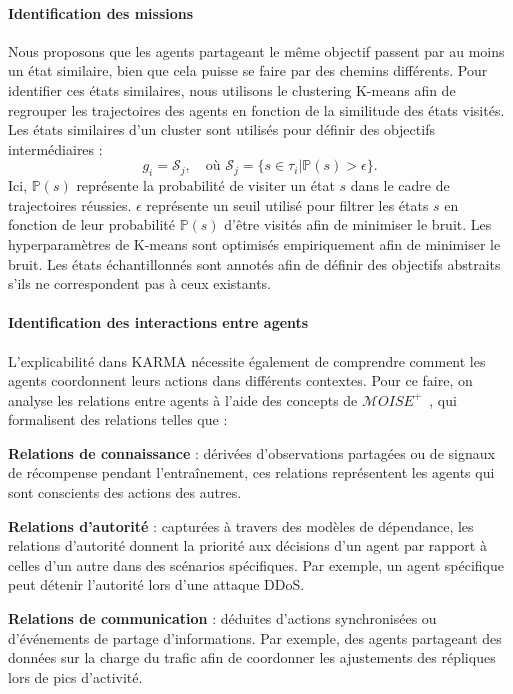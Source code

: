 \paragraph*{\textbf{Identification des missions}}

Nous proposons que les agents partageant le même objectif passent par au moins un état similaire, bien que cela puisse se faire par des chemins différents. Pour identifier ces états similaires, nous utilisons le clustering K-means afin de regrouper les trajectoires des agents en fonction de la similitude des états visités. Les états similaires d'un cluster sont utilisés pour définir des objectifs intermédiaires :
\[
g_i = \mathcal{S}_j, \quad \text{où } \mathcal{S}_j = \{s \in \tau_i | \mathbb{P}(s) > \epsilon\}.
\]
Ici, $\mathbb{P}(s)$ représente la probabilité de visiter un état $s$ dans le cadre de trajectoires réussies. $\epsilon$ représente un seuil utilisé pour filtrer les états $s$ en fonction de leur probabilité $\mathbb{P}(s)$ d'être visités afin de minimiser le bruit. Les hyperparamètres de K-means sont optimisés empiriquement afin de minimiser le bruit. Les états échantillonnés sont annotés afin de définir des objectifs abstraits s'ils ne correspondent pas à ceux existants.


\paragraph*{\textbf{Identification des interactions entre agents}}

L'explicabilité dans KARMA nécessite également de comprendre comment les agents coordonnent leurs actions dans différents contextes. Pour ce faire, on analyse les relations entre agents à l'aide des concepts de $\mathcal{M}OISE^+$~\cite{hubner2002moise}, qui formalisent des relations telles que :
\begin{enumerate*}[label=\textbf{\arabic*)}, itemjoin={;\quad }]
    \item \textbf{Relations de connaissance} : dérivées d'observations partagées ou de signaux de récompense pendant l'entraînement, ces relations représentent les agents qui sont conscients des actions des autres.
    \item \textbf{Relations d'autorité} : capturées à travers des modèles de dépendance, les relations d'autorité donnent la priorité aux décisions d'un agent par rapport à celles d'un autre dans des scénarios spécifiques. Par exemple, un agent spécifique peut détenir l'autorité lors d'une attaque DDoS.
    \item \textbf{Relations de communication} : déduites d'actions synchronisées ou d'événements de partage d'informations. Par exemple, des agents partageant des données sur la charge du trafic afin de coordonner les ajustements des répliques lors de pics d'activité.
\end{enumerate*}


